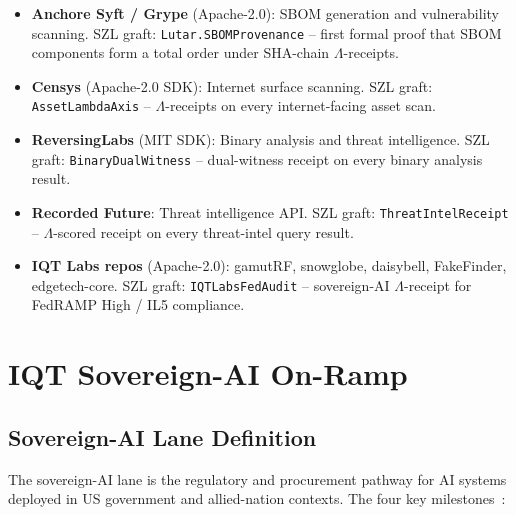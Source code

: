 \begin{itemize}
  \item \textbf{Anchore Syft / Grype} (Apache-2.0): SBOM generation and
    vulnerability scanning.  SZL graft: \texttt{Lutar.SBOMProvenance} --
    first formal proof that SBOM components form a total order under
    SHA-chain $\Lambda$-receipts.
  \item \textbf{Censys} (Apache-2.0 SDK): Internet surface scanning.
    SZL graft: \texttt{AssetLambdaAxis} -- $\Lambda$-receipts on every
    internet-facing asset scan.
  \item \textbf{ReversingLabs} (MIT SDK): Binary analysis and threat
    intelligence.  SZL graft: \texttt{BinaryDualWitness} -- dual-witness
    receipt on every binary analysis result.
  \item \textbf{Recorded Future}: Threat intelligence API.  SZL graft:
    \texttt{ThreatIntelReceipt} -- $\Lambda$-scored receipt on every
    threat-intel query result.
  \item \textbf{IQT Labs repos} (Apache-2.0): gamutRF, snowglobe, daisybell,
    FakeFinder, edgetech-core.  SZL graft:
    \texttt{IQTLabsFedAudit} -- sovereign-AI $\Lambda$-receipt for FedRAMP
    High / IL5 compliance.
\end{itemize}

\section{IQT Sovereign-AI On-Ramp}
\label{sec:iqt-sovereign}

\subsection{Sovereign-AI Lane Definition}
\label{ssec:sovereign-ai-lane}

The sovereign-AI lane is the regulatory and procurement pathway for
AI systems deployed in US government and allied-nation contexts.  The
four key milestones~\cite{szl_iqt_graft,iqt_labs_scout}:

